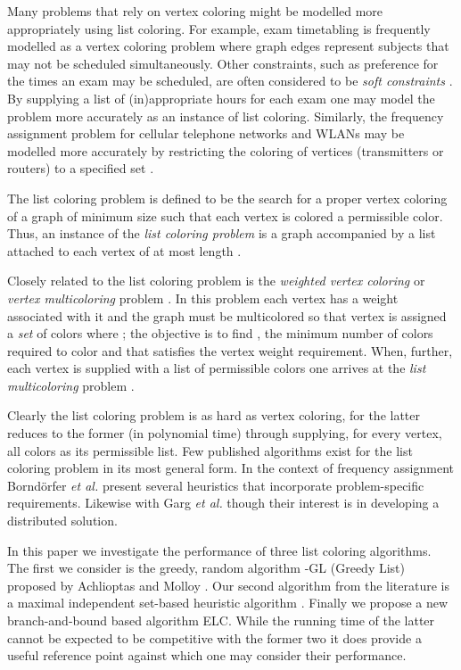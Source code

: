 \documentclass[10pt]{article}
\begin{document}
Many problems that rely on vertex coloring might be modelled more
appropriately using list coloring.  For example, exam timetabling is
frequently modelled as a vertex coloring problem where graph edges
represent subjects that may not be scheduled simultaneously.  Other
constraints, such as preference for the times an exam may be scheduled,
are often considered to be \emph{soft constraints} \cite{QuBur2009}.  By
supplying a list of (in)appropriate hours for each exam one may model
the problem more accurately as an instance of list coloring.  Similarly,
the frequency assignment problem for cellular telephone networks and
\textsc{WLAN}s may be modelled more accurately by restricting the
coloring of vertices (transmitters or routers) to a specified set
\cite{borndorfer-etal-98:FreqAss}.

The list coloring problem is defined to be the search for a proper
vertex coloring of a graph of minimum size such that each vertex is
colored a permissible color.  Thus, an instance of the \emph{list
  coloring problem} is a graph accompanied by a list
  attached to each vertex of at most length
  .

Closely related to the list coloring problem is the \emph{weighted vertex
  coloring} or \emph{vertex multicoloring} problem
\cite{malaguti2010,mehrotra-trick-07:multicol-BP,journals/dmgt/CaramiaF04,NET:NET1028}.
In this problem each vertex has a weight associated with it and the
graph  must be multicolored so that vertex  is assigned a
\emph{set} of colors  where ;
the objective is to find , the minimum number of colors required
to color  and that satisfies the vertex weight requirement.  When,
further, each vertex is supplied with a list of permissible colors one
arrives at the \emph{list multicoloring} problem
\cite{DBLP:journals/corr/abs-1202-4842}.

Clearly the list coloring problem is as hard as vertex coloring, for the
latter reduces to the former (in polynomial time) through supplying, for
every vertex, all colors as its permissible list.  Few published
algorithms exist for the list coloring problem in its most general form.
In the context of frequency assignment Borndörfer \emph{et al.} \cite{borndorfer-etal-98:FreqAss}  present
several heuristics that incorporate problem-specific requirements.
Likewise with Garg \emph{et al.}  \cite{Garg96distributedlist} though
their interest is in developing a distributed solution.

In this paper we investigate the performance of three list coloring
algorithms.  The first we consider is the greedy, random algorithm
-GL (Greedy List) proposed by Achlioptas and Molloy
\cite{Achlioptas97theanalysis}.  Our second algorithm from the
literature is a maximal independent set-based heuristic algorithm
\cite{tsouros-satratzemi-05}.  Finally we propose a new
branch-and-bound based algorithm \textsc{ELC}.  While the running time of the
latter cannot be expected to be competitive with the former two it does
provide a useful reference point against which one may consider their
performance.
\end{document}
